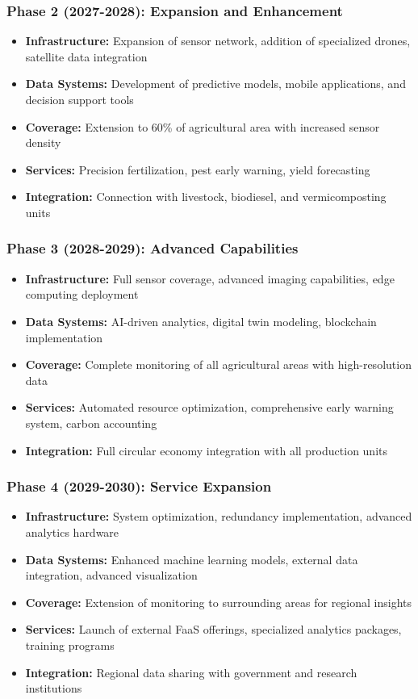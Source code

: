 \subsubsection{Phase 2 (2027-2028): Expansion and Enhancement}
\begin{itemize}
    \item \textbf{Infrastructure:} Expansion of sensor network, addition of specialized drones, satellite data integration
    \item \textbf{Data Systems:} Development of predictive models, mobile applications, and decision support tools
    \item \textbf{Coverage:} Extension to 60\% of agricultural area with increased sensor density
    \item \textbf{Services:} Precision fertilization, pest early warning, yield forecasting
    \item \textbf{Integration:} Connection with livestock, biodiesel, and vermicomposting units
\end{itemize}

\subsubsection{Phase 3 (2028-2029): Advanced Capabilities}
\begin{itemize}
    \item \textbf{Infrastructure:} Full sensor coverage, advanced imaging capabilities, edge computing deployment
    \item \textbf{Data Systems:} AI-driven analytics, digital twin modeling, blockchain implementation
    \item \textbf{Coverage:} Complete monitoring of all agricultural areas with high-resolution data
    \item \textbf{Services:} Automated resource optimization, comprehensive early warning system, carbon accounting
    \item \textbf{Integration:} Full circular economy integration with all production units
\end{itemize}

\subsubsection{Phase 4 (2029-2030): Service Expansion}
\begin{itemize}
    \item \textbf{Infrastructure:} System optimization, redundancy implementation, advanced analytics hardware
    \item \textbf{Data Systems:} Enhanced machine learning models, external data integration, advanced visualization
    \item \textbf{Coverage:} Extension of monitoring to surrounding areas for regional insights
    \item \textbf{Services:} Launch of external FaaS offerings, specialized analytics packages, training programs
    \item \textbf{Integration:} Regional data sharing with government and research institutions
\end{itemize}

